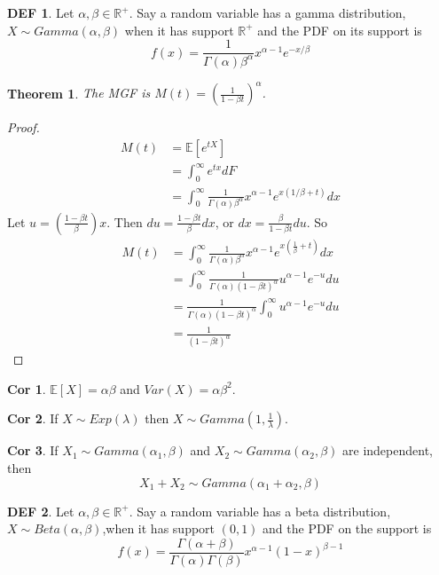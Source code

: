 \documentclass{article}
\newtheorem{theorem}{Theorem}
\theoremstyle{definition}\newtheorem{definition}{DEF}
\theoremstyle{definition}\newtheorem{example}{Ex}
\theoremstyle{lemma}\newtheorem{lemma}{Lemma}
\theoremstyle{corrolary}\newtheorem{corrolary}{Cor}
\begin{document}
\begin{definition}
Let $\alpha, \beta \in \mathbb{R}^+$.
Say a random variable has a gamma distribution, $X\sim Gamma(\alpha, \beta)$ when it has support $\mathbb{R}^+$ and the PDF on its support is
\begin{equation}
f(x)=\frac{1}{\Gamma (\alpha)\beta^\alpha} x^{\alpha -1}e^{{-x/\beta}}
\end{equation}
\end{definition}

\begin{theorem}
The MGF is $M(t)=\left( \frac{1}{1-\beta t}\right)^\alpha$.
\end{theorem}
\begin{proof}
\begin{align*}
M(t)&=\mathbb{E}[e^{tX}]\\
&=\int_0^\infty e^{tx}dF\\
&=\int_0^\infty \frac{1}{\Gamma (\alpha)\beta^\alpha}x^{\alpha-1}e^{x({1/\beta}+t)}dx
\end{align*}
Let $u=\left(\frac{1-\beta t}{\beta}\right)x$.
Then $du = \frac{1-\beta t}{\beta} dx$, or $dx = \frac{\beta}{1-\beta t}du$.
So
\begin{align*}
M(t)&=\int_0^\infty \frac{1}{\Gamma (\alpha)\beta^\alpha}x^{\alpha-1}e^{x(\frac{1}{\beta}+t)}dx\\
&=\int_0^\infty \frac{1}{\Gamma (\alpha)(1-\beta t)^\alpha} u^{\alpha-1} e^{-u} du\\
&=\frac{1}{\Gamma (\alpha)(1-\beta t)^\alpha} \int_0^\infty u^{\alpha -1}e^{-u}du\\
&=\frac{1}{(1-\beta t)^\alpha}
\end{align*}
\end{proof}
\begin{corrolary}
$\mathbb{E}[X]=\alpha \beta$ and $Var(X)=\alpha \beta^2$.
\end{corrolary}
\begin{corrolary}
If $X\sim Exp(\lambda)$ then $X\sim Gamma(1, \frac{1}{\lambda})$.
\end{corrolary}
\begin{corrolary}
If $X_1 \sim Gamma(\alpha_1, \beta)$ and $X_2\sim Gamma(\alpha_2, \beta)$ are independent, then
\begin{equation}
X_1 + X_2 \sim Gamma(\alpha_1 + \alpha_2, \beta)
\end{equation}
\end{corrolary}

\begin{definition}
Let $\alpha, \beta\in \mathbb{R}^+$.
Say a random variable has a beta distribution, $X\sim Beta(\alpha, \beta)$,when it has support $(0,1)$ and the PDF on the support is
\begin{equation}
f(x)=\frac{\Gamma (\alpha + \beta)}{\Gamma(\alpha)\Gamma(\beta)} x^{\alpha -1}(1-x)^{\beta -1}
\end{equation}
\end{definition}
\end{document}
